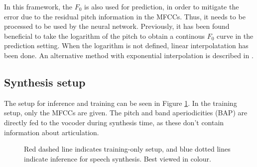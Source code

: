 \documentclass[a4paper]{article}
\begin{document}
In this framework, the \( F_0 \) is also used for prediction, in order to mitigate
the error due to the residual pitch information in the MFCCs. Thus, it
needs to be processed to be used by the neural network. 
Previously, it has been found beneficial to take the logarithm of the
pitch to obtain a continous \( F_0 \) curve in the prediction setting.
When the logarithm is not defined, linear  interpolatation has been done. \cite{Gonzalez2017}
An alternative method with exponential interpolation is described in \cite{Chen1997}.

\subsection{Synthesis setup}

The setup for inference and training can be seen in Figure \ref{fig:structure}.
In the training setup, only the MFCCs are given.
The pitch and band aperiodicities (BAP) are directly fed to the vocoder
during synthesis time, as these don't contain information about articulation. 

\begin{figure}
  \vspace{0.5em}
    \caption{Red dashed line indicates training-only setup, and blue dotted lines indicate inference for speech synthesis. Best viewed in colour.}
  \label{fig:structure}
\end{figure}
\end{document}
